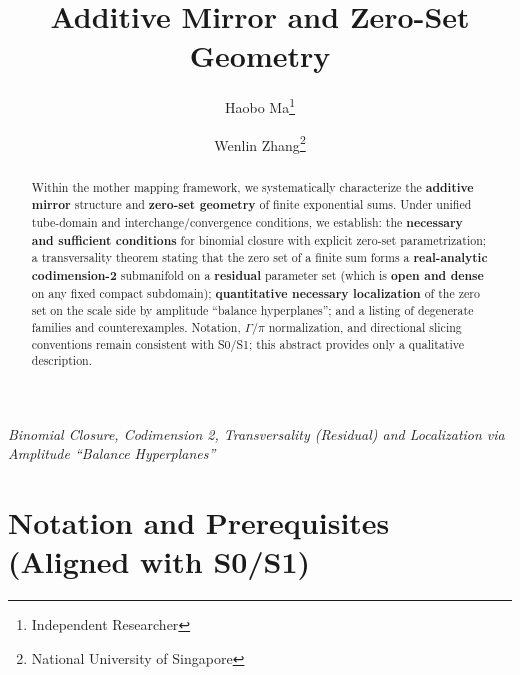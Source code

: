 \documentclass[11pt,a4paper]{article}
\title{Additive Mirror and Zero-Set Geometry}
\author{Haobo Ma\thanks{Independent Researcher} \and Wenlin Zhang\thanks{National University of Singapore}}
\date{}
\theoremstyle{remark}
\begin{document}
\maketitle

\begin{center}
\textit{Binomial Closure, Codimension 2, Transversality (Residual) and Localization via Amplitude ``Balance Hyperplanes''}
\end{center}

\begin{abstract}
Within the mother mapping framework, we systematically characterize the \textbf{additive mirror} structure and \textbf{zero-set geometry} of finite exponential sums. Under unified tube-domain and interchange/convergence conditions, we establish: the \textbf{necessary and sufficient conditions} for binomial closure with explicit zero-set parametrization; a transversality theorem stating that the zero set of a finite sum forms a \textbf{real-analytic codimension-2} submanifold on a \textbf{residual} parameter set (which is \textbf{open and dense} on any fixed compact subdomain); \textbf{quantitative necessary localization} of the zero set on the scale side by amplitude ``balance hyperplanes''; and a listing of degenerate families and counterexamples. Notation, $\Gamma/\pi$ normalization, and directional slicing conventions remain consistent with S0/S1; this abstract provides only a qualitative description.
\end{abstract}

\section{Notation and Prerequisites (Aligned with S0/S1)}
\end{document}
